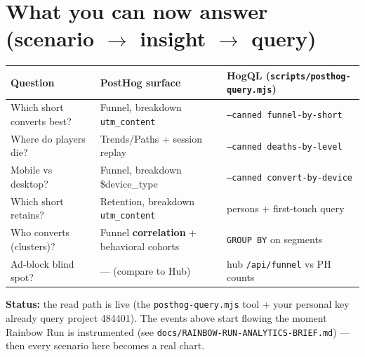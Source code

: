 \documentclass[11pt]{article}
\newcommand{\callout}[1]{\par\smallskip\noindent
  \colorbox{soft}{\parbox{\dimexpr\linewidth-2\fboxsep\relax}{\color{ink}#1}}\par\smallskip}
\begin{document}
\section{What you can now answer (scenario $\to$ insight $\to$ query)}
\begin{center}\footnotesize\setlength{\tabcolsep}{4pt}
\begin{tabular}{@{}P{3.0cm}P{5.2cm}P{5.8cm}@{}}
\toprule
Question & PostHog surface & HogQL (\texttt{scripts/posthog-query.mjs}) \\
\midrule
Which short converts best? & Funnel, breakdown \texttt{utm\_content} & \texttt{--canned funnel-by-short} \\
Where do players die? & Trends/Paths + session replay & \texttt{--canned deaths-by-level} \\
Mobile vs desktop? & Funnel, breakdown \$device\_type & \texttt{--canned convert-by-device} \\
Which short retains? & Retention, breakdown \texttt{utm\_content} & persons + first-touch query \\
Who converts (clusters)? & Funnel \textbf{correlation} + behavioral cohorts & \texttt{GROUP BY} on segments \\
Ad-block blind spot? & --- (compare to Hub) & hub \texttt{/api/funnel} vs PH counts \\
\bottomrule
\end{tabular}
\end{center}

\callout{\textbf{Status:} the read path is live (the \texttt{posthog-query.mjs} tool + your personal
key already query project 484401). The events above start flowing the moment Rainbow Run is
instrumented (see \texttt{docs/RAINBOW-RUN-ANALYTICS-BRIEF.md}) --- then every scenario here becomes
a real chart.}
\end{document}
